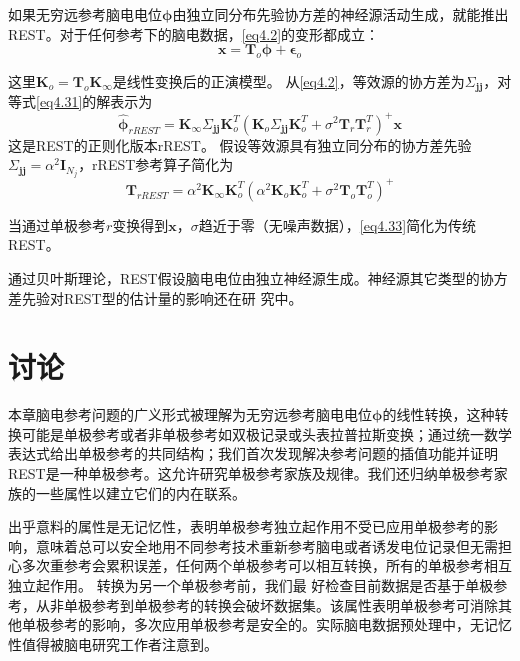 如果无穷远参考脑电电位$\mathbf{\phi}$由独立同分布先验协方差的神经源活动生成，就能推出REST。对于任何参考下的脑电数据，\eqref{eq4.2}的变形都成立：
\begin{equation}\label{eq4.31}
\mathbf{x}=\mathbf{T}_o\mathbf{\phi}+\mathbf{\epsilon}_o
\end{equation}

这里$\mathbf{K}_o=\mathbf{T}_o\mathbf{K}_{\infty}$是线性变换后的正演模型。 从\eqref{eq4.2}，等效源的协方差为$\Sigma_{\mathbf{jj}}$，对等式\eqref{eq4.31}的解表示为
\begin{equation}\label{eq4.32}
\hat{\mathbf{\phi}}_{rREST}=\mathbf{K}_{\infty}\Sigma_{\mathbf{jj}}\mathbf{K}_o^T(\mathbf{K}_o\Sigma_{\mathbf{jj}}\mathbf{K}_o^T+\sigma^2\mathbf{T}_r\mathbf{T}_r^T)^+\mathbf{x}
\end{equation}
这是REST的正则化版本rREST。 假设等效源具有独立同分布的协方差先验$\Sigma_\mathbf{jj}=\alpha^2\mathbf{I}_{N_j}$，rREST参考算子简化为
\begin{equation}\label{eq4.33}
\mathbf{T}_{rREST}=\alpha^2\mathbf{K}_{\infty}\mathbf{K}_o^T(\alpha^2\mathbf{K}_o\mathbf{K}_o^T+\sigma^2\mathbf{T}_o\mathbf{T}_o^T)^+
\end{equation}

当通过单极参考$r$变换得到$\mathbf{x}$，$\sigma$趋近于零（无噪声数据），\eqref{eq4.33}简化为传统REST。

通过贝叶斯理论，REST假设脑电电位由独立神经源生成。神经源其它类型的协方差先验对REST型的估计量的影响还在研
究中。 
\section{讨论}
本章脑电参考问题的广义形式被理解为无穷远参考脑电电位$\mathbf{\phi}$的线性转换，这种转换可能是单极参考或者非单极参考如双极记录或头表拉普拉斯变换；通过统一数学表达式给出单极参考的共同结构；我们首次发现解决参考问题的插值功能并证明REST是一种单极参考。这允许研究单极参考家族及规律。我们还归纳单极参考家族的一些属性以建立它们的内在联系。 

出乎意料的属性是无记忆性，表明单极参考独立起作用不受已应用单极参考的影响，意味着总可以安全地用不同参考技术重新参考脑电或者诱发电位记录但无需担心多次重参考会累积误差，任何两个单极参考可以相互转换，所有的单极参考相互独立起作用。 转换为另一个单极参考前，我们最
好检查目前数据是否基于单极参考，从非单极参考到单极参考的转换会破坏数据集。该属性表明单极参考可消除其他单极参考的影响，多次应用单极参考是安全的。实际脑电数据预处理中，无记忆性值得被脑电研究工作者注意到。

